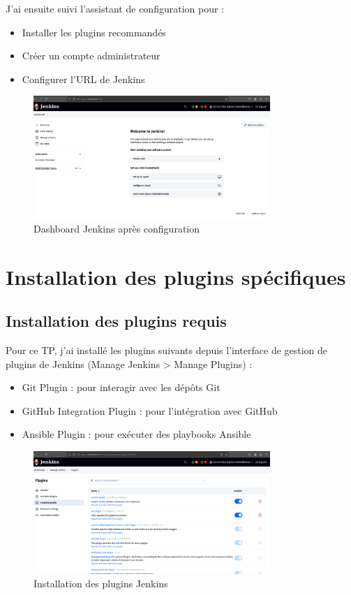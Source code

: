 \documentclass{article}
\begin{document}
J'ai ensuite suivi l'assistant de configuration pour :
\begin{itemize}
    \item Installer les plugins recommandés
    \item Créer un compte administrateur
    \item Configurer l'URL de Jenkins
\end{itemize}

\begin{figure}[h]
    \centering
    \includegraphics[width=0.8\textwidth]{images/jenkins_dashboard.png}
    \caption{Dashboard Jenkins après configuration}
    \label{fig:jenkins_dashboard}
\end{figure}

\section{Installation des plugins spécifiques}
\subsection{Installation des plugins requis}
Pour ce TP, j'ai installé les plugins suivants depuis l'interface de gestion de plugins de Jenkins (Manage Jenkins > Manage Plugins) :
\begin{itemize}
    \item Git Plugin : pour interagir avec les dépôts Git
    \item GitHub Integration Plugin : pour l'intégration avec GitHub
    \item Ansible Plugin : pour exécuter des playbooks Ansible
\end{itemize}

\begin{figure}[h]
    \centering
    \includegraphics[width=0.8\textwidth]{images/jenkins_plugins.png}
    \caption{Installation des plugins Jenkins}
    \label{fig:jenkins_plugins}
\end{figure}
\end{document}
